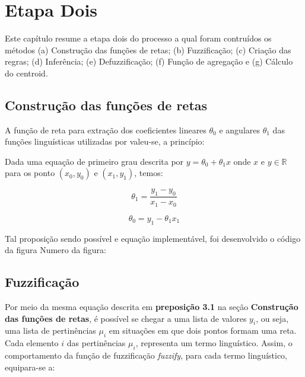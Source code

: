 \documentclass[courier]{uninove-ppgi}
\begin{document}
	
	\chapter{Etapa Dois}
    
        \begin{resumocapitulo}
            Este capítulo resume a etapa dois do processo a qual foram contruídos os métodos (a) Construção das funções de retas; (b) Fuzzificação; (c) Criação das regras; (d) Inferência; (e) Defuzzificação; (f) Função de agregação e (g) Cálculo do centroid.
        \end{resumocapitulo}
		
		\section{Construção das funções de retas}
		
		    A função de reta para extração dos coeficientes lineares $\theta_{0}$ e angulares $\theta_{1}$ das funções linguísticas utilizadas por  valeu-se, a princípio:
		    
		    \begin{proposicao}
		    
		        Dada uma equação de primeiro grau descrita por $y = \theta_{0} + \theta_{1}x$ onde $x$ e $y \in \mathbb{R}$ para os ponto $(x_{0}, y_{0})$ e $(x_{1}, y_{1})$, temos:
		        
		        \begin{equation}
		            \theta_{1} = \frac{y_{1} - y_{0}}{x_{1} - x_{0}}
		        \end{equation}
		        
		        \begin{equation}
		            \theta_{0} = y_{1} - \theta_{1}x_{1} 
		        \end{equation}
		        
		    \end{proposicao}
			 
			 Tal proposição sendo possível e equação implementável, foi desenvolvido o código da figura {Numero da figura}:
			 
			 
		\section{Fuzzificação}
		
			 Por meio da mesma equação descrita em \textbf{preposição 3.1} na seção \textbf{Construção das funções de retas}, é possível se chegar a uma lista de valores $y_{i}$, ou seja, uma lista de pertinências $\mu_{i}$ em situações em que dois pontos formam uma reta. Cada elemento $i$ das pertinências $\mu_{i}$, representa um termo linguístico. Assim, o comportamento da função de fuzzificação \textit{fuzzify}, para cada termo linguístico, equipara-se a:
			 
\end{document}
